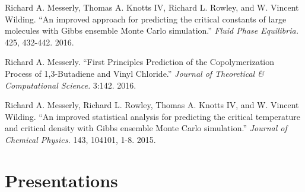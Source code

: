 \documentclass[12pt]{article}
\begin{document}
\begin{etaremune}
\item Richard A. Messerly, Thomas A. Knotts IV, Richard L. Rowley, and W. Vincent Wilding. ``An improved approach for predicting the critical constants of large molecules with Gibbs ensemble Monte Carlo simulation.'' \textit{Fluid Phase Equilibria.} 425, 432-442. 2016.

\item Richard A. Messerly. ``First Principles Prediction of the Copolymerization Process of 1,3-Butadiene and Vinyl Chloride.'' \textit{Journal of Theoretical \& Computational Science.} 3:142. 2016.

\item Richard A. Messerly, Richard L. Rowley, Thomas A. Knotts IV, and W. Vincent Wilding. ``An improved statistical analysis for predicting the critical temperature and critical density with Gibbs ensemble Monte Carlo simulation.'' \textit{Journal of Chemical Physics.} 143, 104101, 1-8. 2015.



\end{etaremune}

\section*{Presentations}
\end{document}
